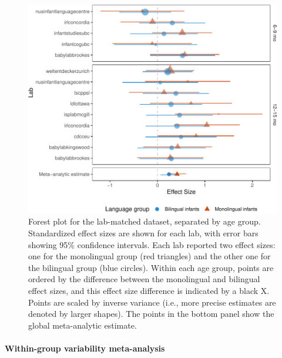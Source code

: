 \documentclass[
  english,
  ,man,floatsintext]{apa6}
\let\oldparagraph\paragraph
\renewcommand{\paragraph}[1]{\oldparagraph{#1}\mbox{}}
\begin{document}
\begin{figure}
\centering
\includegraphics{mb1b-paper_files/figure-latex/unnamed-chunk-3-1.pdf}
\caption{\label{fig:unnamed-chunk-3}Forest plot for the lab-matched dataset, separated by age group. Standardized effect sizes are shown for each lab, with error bars showing 95\% confidence intervals. Each lab reported two effect sizes: one for the monolingual group (red triangles) and the other one for the bilingual group (blue circles). Within each age group, points are ordered by the difference between the monolingual and bilingual effect sizes, and this effect size difference is indicated by a black X. Points are scaled by inverse variance (i.e., more precise estimates are denoted by larger shapes). The points in the bottom panel show the global meta-analytic estimate.}
\end{figure}

\hypertarget{within-group-variability-meta-analysis}{%
\paragraph{Within-group variability meta-analysis}\label{within-group-variability-meta-analysis}}
\end{document}
